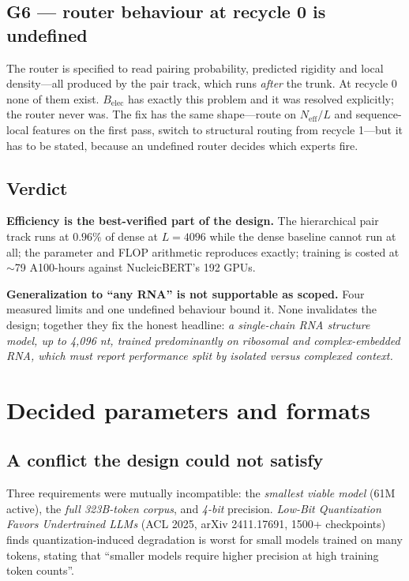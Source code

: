 \documentclass[11pt,a4paper]{article}
\begin{document}
\subsection{G6 --- router behaviour at recycle 0 is undefined}

The router is specified to read pairing probability, predicted rigidity and
local density---all produced by the pair track, which runs \emph{after} the
trunk. At recycle 0 none of them exist. $B_{\mathrm{elec}}$ has exactly this
problem and it was resolved explicitly; the router never was. The fix has the
same shape---route on $N_{\text{eff}}/L$ and sequence-local features on the
first pass, switch to structural routing from recycle 1---but it has to be
stated, because an undefined router decides which experts fire.

\subsection{Verdict}

\textbf{Efficiency is the best-verified part of the design.} The hierarchical
pair track runs at $0.96\%$ of dense at $L=4096$ while the dense baseline cannot
run at all; the parameter and FLOP arithmetic reproduces exactly; training is
costed at $\sim$79 A100-hours against NucleicBERT's 192 GPUs.

\textbf{Generalization to ``any RNA'' is not supportable as scoped.} Four
measured limits and one undefined behaviour bound it. None invalidates the
design; together they fix the honest headline: \emph{a single-chain RNA
structure model, up to 4,096 nt, trained predominantly on ribosomal and
complex-embedded RNA, which must report performance split by isolated versus
complexed context.}

\section{Decided parameters and formats}
\label{sec:decide}

\subsection{A conflict the design could not satisfy}

Three requirements were mutually incompatible: the \emph{smallest viable model}
(61M active), the \emph{full 323B-token corpus}, and \emph{4-bit} precision.
\emph{Low-Bit Quantization Favors Undertrained LLMs} (ACL 2025, arXiv
2411.17691, 1500+ checkpoints) finds quantization-induced degradation is worst
for small models trained on many tokens, stating that ``smaller models require
higher precision at high training token counts''.
\end{document}
